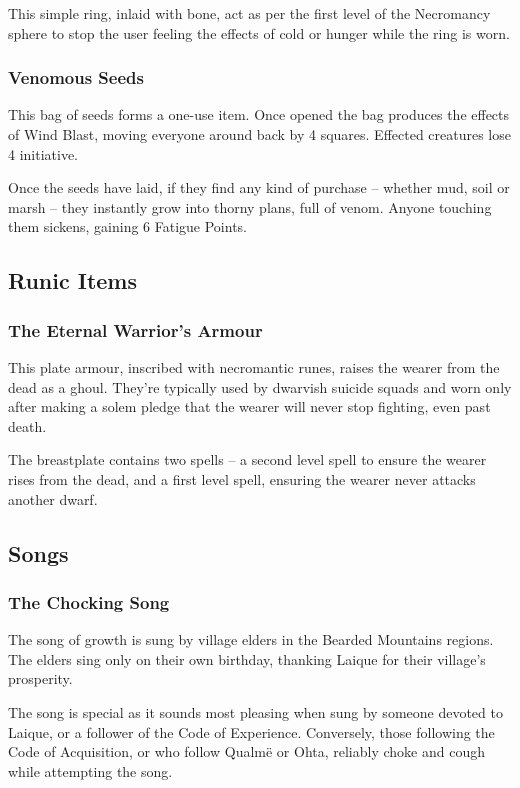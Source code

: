 This simple ring, inlaid with bone, act as per the first level of the Necromancy sphere to stop the user feeling the effects of cold or hunger while the ring is worn.

\subsubsection{Venomous Seeds}

This bag of seeds forms a one-use item.  Once opened the bag produces the effects of Wind Blast, moving everyone around back by 4 squares.  Effected creatures lose 4 initiative.

Once the seeds have laid, if they find any kind of purchase -- whether mud, soil or marsh -- they instantly grow into thorny plans, full of venom.  Anyone touching them sickens, gaining 6 Fatigue Points.

\subsection{Runic Items}

\subsubsection{The Eternal Warrior's Armour}

This plate armour, inscribed with necromantic runes, raises the wearer from the dead as a ghoul.  They're typically used by dwarvish suicide squads and worn only after making a solem pledge that the wearer will never stop fighting, even past death.

The breastplate contains two spells -- a second level spell to ensure the wearer rises from the dead, and a first level spell, ensuring the wearer never attacks another dwarf.

\subsection{Songs}

\subsubsection{The Chocking Song}
The song of growth is sung by village elders in the Bearded Mountains regions.  The elders sing only on their own birthday, thanking Laique for their village's prosperity.

The song is special as it sounds most pleasing when sung by someone devoted to Laique, or a follower of the Code of Experience.  Conversely, those following the Code of Acquisition, or who follow Qualm\"{e} or Ohta, reliably choke and cough while attempting the song.

